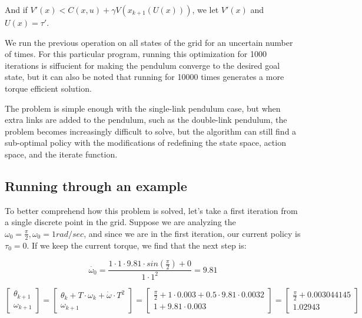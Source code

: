\documentclass{article}
\begin{document}
And if $V'(x)<C(x,u) + \gamma V(x_{k+1}(U(x)))$, we let $V'(x)$ and $U(x)={\tau'}$.

We run the previous operation on all states of the grid for an uncertain number of times. For this particular program, running this optimization for 1000 iterations is siffucient for making the pendulum converge to the desired goal state, but it can also be noted that running for 10000 times generates a more torque efficient solution.

The problem is simple enough with the single-link pendulum case, but when extra links are added to the pendulum, such as the double-link pendulum, the problem becomes increasingly difficult to solve, but the algorithm can still find a sub-optimal policy with the modifications of redefining the state space, action space, and the iterate function.

\subsection{Running through an example}

To better comprehend how this problem is solved, let’s take a first iteration from a single discrete point in the grid. Suppose we are analyzing the $\omega_0=\frac{\pi}{2}, \omega_0=1 rad/sec$, and since we are in the first iteration, our current policy is $\tau_0=0$. If we keep the current torque, we find that the next step is:
	
\begin{equation} 
\dot{\omega_0} = \frac{1 \cdot 1 \cdot 9.81 \cdot sin(\frac{\pi}{2})+0}{1 \cdot 1^2} = 9.81
\end{equation}

\begin{equation} 
\begin{bmatrix}
\theta_{k+1} \\
\omega_{k+1}
\end{bmatrix}
=
\begin{bmatrix}
\theta_{k} + T \cdot \omega_{k} + \dot{\omega} \cdot T^2 \\
\omega_{k+1}
\end{bmatrix}
=
\begin{bmatrix}
\frac{\pi}{2}+1 \cdot 0.003 + 0.5 \cdot 9.81 \cdot 0.0032 \\
1 + 9.81 \cdot 0.003
\end{bmatrix}
=
\begin{bmatrix}
\frac{\pi}{2}+0.003044145 \\
1.02943
\end{bmatrix}
\end{equation}
\end{document}
